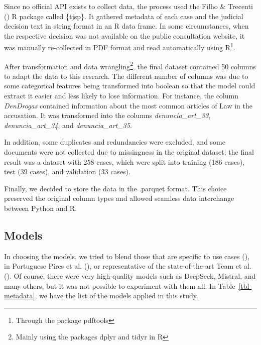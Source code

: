\documentclass[
  12pt,
]{article}
\begin{document}
Since no official API exists to collect data, the process used the Filho
\& Trecenti () R package called
\{tjsp\}. It gathered metadata of each case and the judicial decision
text in string format in an R data frame. In some circumstances, when
the respective decision was not available on the public consultation
website, it was manually re-collected in PDF format and read
automatically using R\footnote{Through the package pdftools}.

After transformation and data wrangling\footnote{Mainly using the
  packages dplyr and tidyr in R}, the final dataset contained 50 columns
to adapt the data to this research. The different number of columns was
due to some categorical features being transformed into boolean so that
the model could extract it easier and less likely to lose information.
For instance, the column \emph{DenDrogas} contained information about
the most common articles of Law in the accusation. It was transformed
into the columns \emph{denuncia\_art\_33}, \emph{denuncia\_art\_34}, and
\emph{denuncia\_art\_35}.

In addition, some duplicates and redundancies were excluded, and some
documents were not collected due to missingness in the original dataset;
the final result was a dataset with 258 cases, which were split into
training (186 cases), test (39 cases), and validation (33 cases).

Finally, we decided to store the data in the .parquet format. This
choice preserved the original column types and allowed seamless data
interchange between Python and R.

\subsection{Models}\label{sec-models}

In choosing the models, we tried to blend those that are specific to use
cases (), in Portuguese Pires et al.
(), or representative of the
state-of-the-art Team et al. (). Of
course, there were very high-quality models such as DeepSeek, Mistral,
and many others, but it was not possible to experiment with them all. In
Table~\ref{tbl-metadata}, we have the list of the models applied in this
study.

\begingroup\fontsize{9}{11}\selectfont
\end{document}
